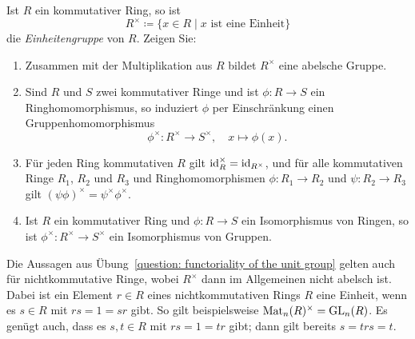 \begin{question}[subtitle = Funktorialität der Einheitengruppe]
  \label{question: functoriality of the unit group}
  Ist $R$ ein kommutativer Ring, so ist
  \[
              R^\times
    \coloneqq \{x \in R \mid \text{$x$ ist eine Einheit}\}
  \]
  die \emph{Einheitengruppe} von $R$.
  Zeigen Sie:
  \begin{enumerate}
    \item
      Zusammen mit der Multiplikation aus $R$ bildet $R^\times$ eine abelsche Gruppe.
    \item
      Sind $R$ und $S$ zwei kommutativer Ringe und ist $\phi \colon R \to S$ ein Ringhomomorphismus, so induziert $\phi$ per Einschränkung einen Gruppenhomomorphismus
      \[
        \phi^\times \colon R^\times \to S^\times,
        \quad
        x \mapsto \phi(x).
      \]
    \item
      Für jeden Ring kommutativen $R$ gilt $\operatorname{id}_R^\times = \operatorname{id}_{R^\times}$, und für alle kommutativen Ringe $R_1$, $R_2$ und $R_3$ und Ringhomomorphismen $\phi \colon R_1 \to R_2$ und $\psi \colon R_2 \to R_3$ gilt $(\psi \phi)^\times = \psi^\times \phi^\times$.
    \item
      Ist $R$ ein kommutativer Ring und $\phi \colon R \to S$ ein Isomorphismus von Ringen, so ist $\phi^\times \colon R^\times \to S^\times$ ein Isomorphismus von Gruppen.
  \end{enumerate}
\end{question}


\begin{remark*}
  Die Aussagen aus Übung~\ref{question: functoriality of the unit group} gelten auch für nichtkommutative Ringe, wobei $R^\times$ dann im Allgemeinen nicht abelsch ist.
  Dabei ist ein Element $r \in R$ eines nichtkommutativen Rings $R$ eine Einheit, wenn es $s \in R$ mit $rs = 1 = sr$ gibt.
  So gilt beispielsweise $\operatorname{Mat}_n(R)^\times = \operatorname{GL}_n(R)$.
  Es genügt auch, dass es $s, t \in R$ mit $rs = 1 = tr$ gibt; dann gilt bereits $s = trs = t$.
\end{remark*}


